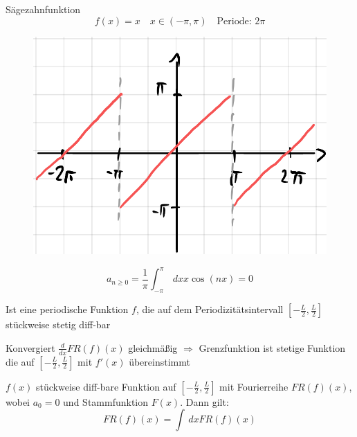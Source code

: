 	\begin{Bsp}{Sägezahnfunktion}
		$$f(x)=x \quad x \in (-\pi,\pi) \quad \textrm{Periode: } 2\pi$$
		\begin{figure}[H]
			\centering
			\includegraphics[width=0.4\linewidth]{Grafiken/2_Fourierreihen/Grafik3.PNG}
		\end{figure}

		$$a_{n \geq 0} = \frac{1}{\pi} \int_{-\pi}^{\pi} \,dx x \cos(nx) = 0$$
	\end{Bsp}

	\begin{Satz}
		Ist eine periodische Funktion $f$, die auf dem Periodizitätsintervall
		$[-\frac{L}{2}, \frac{L}{2}]$ stückweise stetig diff-bar
	\end{Satz}

	\begin{Bem}
		Konvergiert $\frac{d}{dx} FR(f)(x)$ gleichmäßig $\Rightarrow$
		Grenzfunktion ist stetige Funktion die auf $[-\frac{L}{2}, \frac{L}{2}]$
		mit $f'(x)$ übereinstimmt
	\end{Bem}

	\begin{Satz}
		$f(x)$ stückweise diff-bare Funktion auf $[-\frac{L}{2}, \frac{L}{2}]$ mit
		Fourierreihe $FR(f)(x)$, wobei $a_0 = 0$ und Stammfunktion $F(x)$.
		Dann gilt:
		$$FR(f)(x) = \int \,dx FR(f)(x)$$
	\end{Satz}
